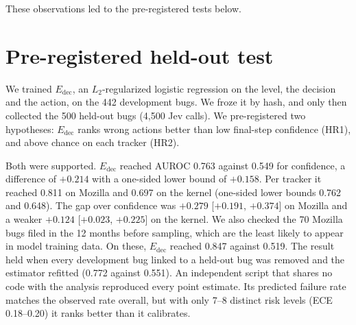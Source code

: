 \begin{colfigure}
\centering
{}
\caption{Confidence AUROCs on the development bugs. The dashed line
marks chance. Only \choice{}'s confidence discriminates its own errors.
Composed confidence is at chance for both escalation targets: (A) missed
serious bugs and (B) any wrong action.}
\label{fig:forest}
\end{colfigure} These observations led to the pre-registered tests below.

\section{Pre-registered held-out test}
\label{sec:heldout}

We trained $E_{\text{dec}}$, an $L_2$-regularized logistic regression on
the \score{} level, the \noul{} decision and the action, on the 442
development bugs. We froze it by hash, and only then collected the 500
held-out bugs (4{,}500 Jev calls). We pre-registered two hypotheses:
$E_{\text{dec}}$ ranks wrong actions better than low final-step
confidence (HR1), and above chance on each tracker (HR2).

Both were supported. $E_{\text{dec}}$ reached AUROC 0.763 against 0.549
for confidence, a difference of $+0.214$ with a one-sided lower bound of
$+0.158$. Per tracker it reached 0.811 on Mozilla and 0.697 on the
kernel (one-sided lower bounds 0.762 and 0.648). The gap over confidence was $+0.279$ [$+0.191$, $+0.374$] on
Mozilla and a weaker $+0.124$ [$+0.023$, $+0.225$] on the kernel. We also checked the 70 Mozilla bugs filed in the 12 months before
sampling, which are the least likely to appear in model training data.
On these, $E_{\text{dec}}$ reached 0.847 against 0.519. The result held when every development bug linked to a held-out
bug was removed and the estimator refitted (0.772 against 0.551). An independent script that shares no code with the analysis reproduced
every point estimate. Its predicted failure rate matches the observed rate overall, but with
only 7--8 distinct risk levels (ECE 0.18--0.20) it ranks better than it
calibrates.

